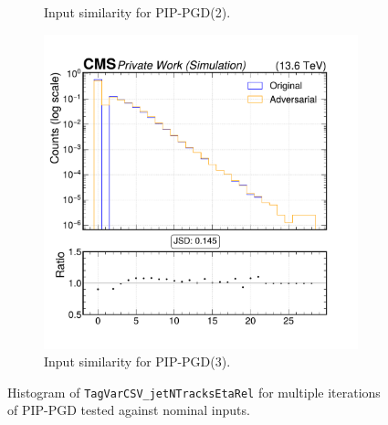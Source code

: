 \begin{figure}[htbp]
\begin{subfigure}[t]{0.32\textwidth}
    \caption*{Input similarity for PIP-PGD(2).}
  \end{subfigure}\hfill
  \begin{subfigure}[t]{0.32\textwidth}
    \includegraphics[width=\linewidth]{media/output/features/compare/combined_it_3/cmp_global_features_TagVarCSV_jetNTracksEtaRel.pdf}
    \caption*{Input similarity for PIP-PGD(3).}
  \end{subfigure}

  \caption*{Histogram of \texttt{TagVarCSV\_jetNTracksEtaRel} for multiple iterations of PIP-PGD tested against nominal inputs.}
  \label{fig:combined_input_TagVarCSV_jetNTracksEtaRel}
\end{figure}

